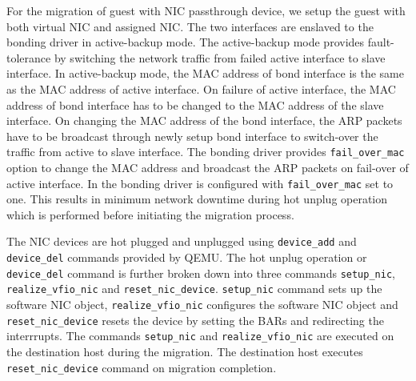 

For the migration of guest with NIC passthrough device, we setup the 
guest with both virtual NIC and assigned NIC. The two interfaces 
are enslaved to the bonding driver in active-backup mode. The 
active-backup mode provides fault-tolerance by switching the
network traffic from failed active interface to slave interface.
In active-backup mode, the MAC address of bond interface 
is the same as the MAC address of active interface. On failure 
of active interface, the MAC address of bond interface has to 
be changed to the MAC address of the slave interface. On changing
the MAC address of the bond interface, the ARP packets have to be
broadcast through newly setup bond interface to switch-over the
traffic from active to slave interface. The bonding driver 
provides \texttt{fail\_over\_mac} option to change 
the MAC address and broadcast the ARP packets on fail-over of
active interface. In \na the bonding driver is configured 
with \texttt{fail\_over\_mac} set to one. This results in minimum
network downtime during hot unplug operation which is performed
before initiating the migration process.

The NIC devices are hot plugged and unplugged using 
\texttt{device\_add} and \texttt{device\_del} commands provided
by QEMU. The hot unplug operation or \texttt{device\_del} command
is further broken down into three commands \texttt{setup\_nic}, 
\texttt{realize\_vfio\_nic} and \texttt{reset\_nic\_device}.
\texttt{setup\_nic} command sets up the software NIC object, 
\texttt{realize\_vfio\_nic} configures the software NIC object
and \texttt{reset\_nic\_device} resets the device by setting the 
BARs and redirecting the interrrupts. The commands \texttt{setup\_nic}
and \texttt{realize\_vfio\_nic} are executed on the destination host
during the migration. The destination host executes 
\texttt{reset\_nic\_device} command on migration completion.    
